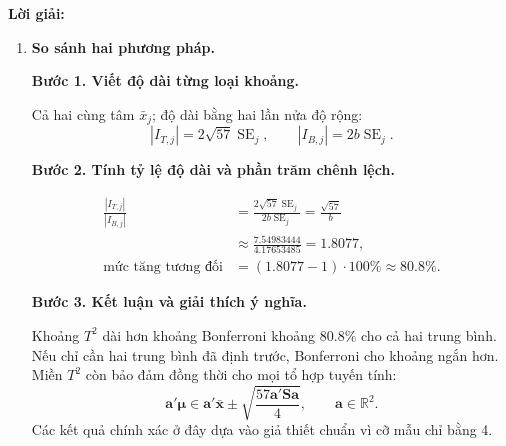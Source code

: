 \documentclass[11pt,a4paper]{article}
\renewcommand{\boldsymbol}[1]{\symbf{#1}}
\newenvironment{solution}{%
  \par\medskip\noindent\textbf{Lời giải:}\par\nobreak\smallskip\noindent\ignorespaces
}{\par}
\newcommand{\step}[2]{\par\medskip\noindent\textbf{Bước #1. #2}\par\nopagebreak[4]\smallskip\noindent}
\begin{document}
\begin{solution}
\begin{enumerate}[label=\textbf{\alph*)}]
\step{4}{Kiểm tra mức tin cậy đồng thời.}
Mỗi khoảng có độ bao phủ $1-0.025=0.975$.
Theo bất đẳng thức Bonferroni:
\begin{align*}
P(\mu_1\in I_{B,1},\mu_2\in I_{B,2})
&\ge1-P(\mu_1\notin I_{B,1})-P(\mu_2\notin I_{B,2})\\
&\ge1-0.025-0.025=0.95.
\end{align*}
\item \textbf{So sánh hai phương pháp.}\par\nopagebreak[4]
\step{1}{Viết độ dài từng loại khoảng.}
Cả hai cùng tâm $\bar{x}_j$; độ dài bằng hai lần nửa độ rộng:
\[
|I_{T,j}|=2\sqrt{57}\operatorname{SE}_j,\qquad
|I_{B,j}|=2b\operatorname{SE}_j.
\]
\step{2}{Tính tỷ lệ độ dài và phần trăm chênh lệch.}
\begin{align*}
\frac{|I_{T,j}|}{|I_{B,j}|}
&=\frac{2\sqrt{57}\operatorname{SE}_j}{2b\operatorname{SE}_j}
=\frac{\sqrt{57}}b\\
&\approx\frac{7.54983444}{4.17653485}=1.8077,\\
\text{mức tăng tương đối}&=(1.8077-1)\cdot100\%\approx80.8\%.
\end{align*}
\step{3}{Kết luận và giải thích ý nghĩa.}
Khoảng $T^2$ dài hơn khoảng Bonferroni khoảng $80.8\%$ cho cả hai trung bình.
Nếu chỉ cần hai trung bình đã định trước, Bonferroni cho khoảng ngắn hơn.
Miền $T^2$ còn bảo đảm đồng thời cho mọi tổ hợp tuyến tính:
\[
\mathbf{a}'\boldsymbol{\mu}\in\mathbf{a}'\bar{\mathbf{x}}
\pm\sqrt{\frac{57\mathbf{a}'\mathbf{S}\mathbf{a}}4},\qquad
\mathbf{a}\in\mathbb{R}^2.
\]
Các kết quả chính xác ở đây dựa vào giả thiết chuẩn vì cỡ mẫu chỉ bằng 4.
\end{enumerate}
\end{solution}
\end{document}
